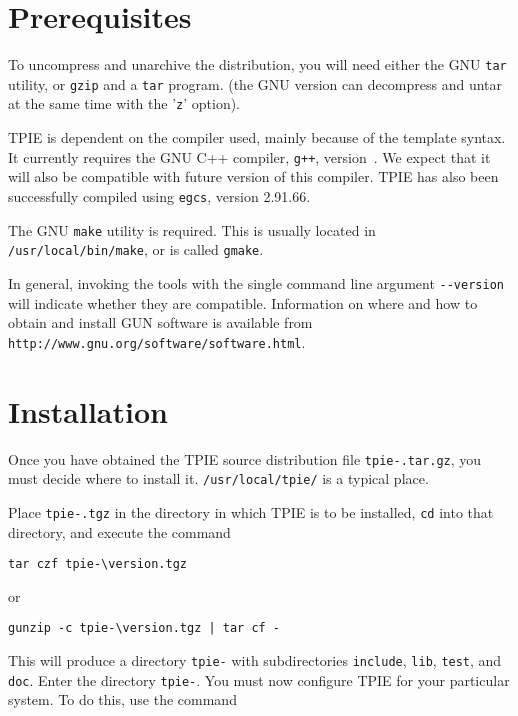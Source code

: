 \section{Prerequisites}
\label{sec:gnu-software}

To uncompress and unarchive the distribution, you will need either the GNU
\verb|tar| utility, or \verb|gzip| and a \verb|tar| program. (the GNU
version can decompress and untar at the same time with the '\verb|z|' option).

TPIE is dependent on the compiler used, mainly because of the template
syntax. It currently requires the GNU C++ compiler, \verb|g++|,
version~\gxxversion. We
expect that it will also be compatible with future version of this
compiler.  TPIE has also been successfully compiled using
\verb|egcs|, version 2.91.66.

The GNU \verb|make| utility is required. This is usually located in
\verb|/usr/local/bin/make|, or is called \verb|gmake|.

In general, invoking the tools with the single command line argument 
\verb|--version| will indicate whether they are compatible.
Information on where and how to obtain and install GUN software is
available from 
{\tt http://www.gnu.org/software/software.html}.

\section{Installation}

Once you have obtained the TPIE source distribution file
{\tt tpie-\version.tar.gz}, you must decide where to install it.
\verb|/usr/local/tpie/| is a typical place.

Place {\tt tpie-\version.tgz} in the directory in which TPIE is to
be installed, \verb|cd| into that directory, and execute the command

\begin{verbatim}
tar czf tpie-\version.tgz
\end{verbatim}

or

\begin{verbatim}
gunzip -c tpie-\version.tgz | tar cf -
\end{verbatim}


This will produce a directory {\tt tpie-\version} with subdirectories
\verb|include|, \verb|lib|, \verb|test|, and \verb|doc|.  Enter the
directory {\tt tpie-\version}.  You must now configure TPIE for your
particular system.  To do this, use the command

